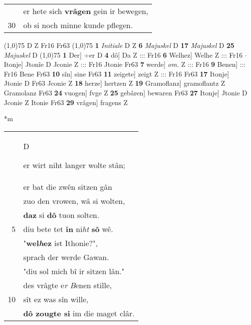 \documentclass[8pt,a4paper,notitlepage]{article}
\begin{document}
\begin{table}[ht]
\begin{minipage}[t]{0.5\linewidth}
\begin{tabular}{rl}
 & er hete sich \textbf{vrâgen} gein ir bewegen,\\ 
30 & ob si noch minne kunde pflegen.\\ 
\end{tabular}
\scriptsize
\line(1,0){75} \newline
D Z Fr16 Fr63 \newline
\line(1,0){75} \newline
\textbf{1} \textit{Initiale} D Z  \textbf{6} \textit{Majuskel} D  \textbf{17} \textit{Majuskel} D  \textbf{25} \textit{Majuskel} D  \newline
\line(1,0){75} \newline
\textbf{1} Der] ÷er D \textbf{4} dô] Da Z ::: Fr16 \textbf{6} Welhez] Welhe Z ::: Fr16  $\cdot$ Itonje] Jtonîe D Jconie Z ::: Fr16 Jtonie Fr63 \textbf{7} werde] \textit{om.} Z ::: Fr16 \textbf{9} Benen] ::: Fr16 Bene Fr63 \textbf{10} sîn] sine Fr63 \textbf{11} zeigete] zeigt Z ::: Fr16 Fr63 \textbf{17} Itonje] Jtonie D Fr63 Jconie Z \textbf{18} herze] hertzen Z \textbf{19} Gramoflanz] gramoflantz Z Gramolanz Fr63 \textbf{24} vuogen] fvge Z \textbf{25} gebâren] bewaren Fr63 \textbf{27} Itonje] Jtonie D Jconie Z Itonie Fr63 \textbf{29} vrâgen] fragens Z \newline
\end{minipage}
\hspace{0.5cm}
\begin{minipage}[t]{0.5\linewidth}
\small
\begin{center}*m
\end{center}
\begin{tabular}{rl}
 & \begin{large}D\end{large}er wirt niht langer wolte stân;\\ 
 & er bat die zwên sitzen gân\\ 
 & zuo den vrowen, wâ si wolten,\\ 
 & \textbf{daz} si \textbf{dô} tuon solten.\\ 
5 & diu bete tet \textbf{in} ni\textit{ht} \textbf{sô} wê.\\ 
 & "\textbf{wel\textit{h}ez} ist Ithonie?",\\ 
 & sprach der werde Gawan.\\ 
 & "diu sol mich bî ir sitzen lân."\\ 
 & des vrâgte e\textit{r} \textit{B}enen stille,\\ 
10 & sît ez was sîn wille,\\ 
 & \textbf{dô zougte si} im die maget clâr.\\ 

\end{tabular}
\end{minipage}
\end{table}
\end{document}
